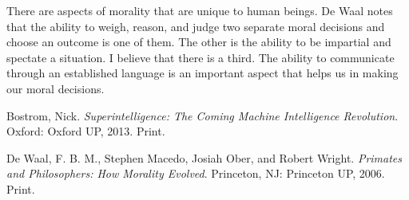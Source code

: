 \documentclass[11pt, oneside]{article}
\begin{document}
\par There are aspects of morality that are unique to human beings. De Waal notes that the ability to weigh, reason, and judge two separate moral decisions and choose an outcome is one of them. The other is the ability to be impartial and spectate a situation. I believe that there is a third. The ability to communicate through an established language is an important aspect that helps us in making our moral decisions. 

\begin{thebibliography}{9}

  Bostrom, Nick. 
  \emph{Superintelligence: The Coming Machine Intelligence Revolution}.
  Oxford: Oxford UP, 2013. 
  Print.
  
  De Waal, F. B. M., Stephen Macedo, Josiah Ober, and Robert Wright.
  \emph{Primates and Philosophers: How Morality Evolved}.
  Princeton, NJ: Princeton UP, 2006.
  Print.

\end{thebibliography}
\end{document}
